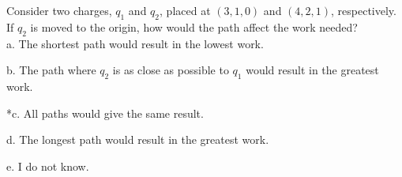
Consider two charges, \(q_1\) and \(q_2\), placed at \((3,1,0)\) and \((4,2,1)\), respectively. If \(q_2\) is moved to the origin, how would the path affect the work needed?\\

a. The shortest path would result in the lowest work.

b. The path where \(q_2\) is as close as possible to \(q_1\) would result in the
greatest work.

*c. All paths would give the same result.

d. The longest path would result in the greatest work.

e. I do not know.\\
